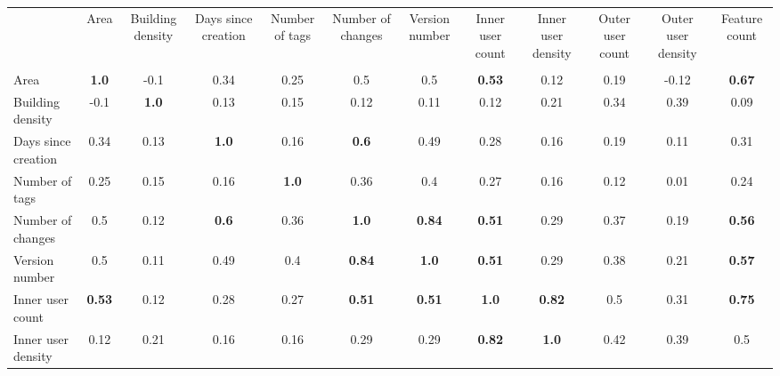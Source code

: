 \begin{tabularx}{\textwidth}{lCCCCCCCCCCC}
\toprule
{} &           Area & Building density & Days since creation & Number of tags & Number of changes & Version number & Inner user count & Inner user density & Outer user count & Outer user density &  Feature count \\
                    &                &                  &                     &                &                   &                &                  &                    &                  &                    &                \\
\midrule
Area                &   \textbf{1.0} &             -0.1 &                0.34 &           0.25 &               0.5 &            0.5 &    \textbf{0.53} &               0.12 &             0.19 &              -0.12 &  \textbf{0.67} \\
Building density    &           -0.1 &     \textbf{1.0} &                0.13 &           0.15 &              0.12 &           0.11 &             0.12 &               0.21 &             0.34 &               0.39 &           0.09 \\
Days since creation &           0.34 &             0.13 &        \textbf{1.0} &           0.16 &      \textbf{0.6} &           0.49 &             0.28 &               0.16 &             0.19 &               0.11 &           0.31 \\
Number of tags      &           0.25 &             0.15 &                0.16 &   \textbf{1.0} &              0.36 &            0.4 &             0.27 &               0.16 &             0.12 &               0.01 &           0.24 \\
Number of changes   &            0.5 &             0.12 &        \textbf{0.6} &           0.36 &      \textbf{1.0} &  \textbf{0.84} &    \textbf{0.51} &               0.29 &             0.37 &               0.19 &  \textbf{0.56} \\
Version number      &            0.5 &             0.11 &                0.49 &            0.4 &     \textbf{0.84} &   \textbf{1.0} &    \textbf{0.51} &               0.29 &             0.38 &               0.21 &  \textbf{0.57} \\
Inner user count    &  \textbf{0.53} &             0.12 &                0.28 &           0.27 &     \textbf{0.51} &  \textbf{0.51} &     \textbf{1.0} &      \textbf{0.82} &              0.5 &               0.31 &  \textbf{0.75} \\
Inner user density  &           0.12 &             0.21 &                0.16 &           0.16 &              0.29 &           0.29 &    \textbf{0.82} &       \textbf{1.0} &             0.42 &               0.39 &            0.5 \\

\end{tabularx}
